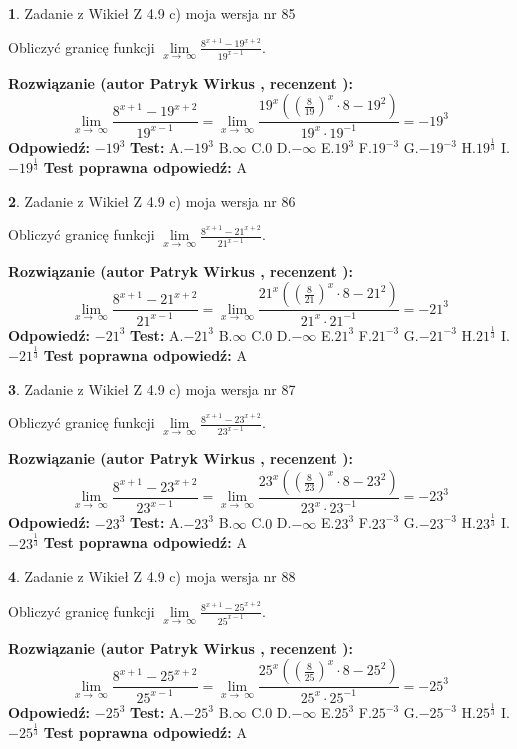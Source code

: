 \documentclass[12pt, a4paper]{article}
\theoremstyle{definition} %
\newtheorem{zad}{}
\newcommand{\zadStart}[1]{\begin{zad}#1\newline}
\newcommand{\zadStop}{\end{zad}}
\newcommand{\rozwStart}[2]{\noindent \textbf{Rozwiązanie (autor #1 , recenzent #2): }\newline}
\newcommand{\rozwStop}{\newline}
\newcommand{\odpStart}{\noindent \textbf{Odpowiedź:}\newline}
\newcommand{\odpStop}{\newline}
\newcommand{\testStart}{\noindent \textbf{Test:}\newline}
\newcommand{\testStop}{\newline}
\newcommand{\kluczStart}{\noindent \textbf{Test poprawna odpowiedź:}\newline}
\newcommand{\kluczStop}{\newline}
\begin{document}
\zadStart{Zadanie z Wikieł Z 4.9 c) moja wersja nr 85}


Obliczyć granicę funkcji  $\lim\limits_{x\to\ \infty}\frac{8^{x+1}-19^{x+2}}{19^{x-1}}$.
\zadStop
\rozwStart{Patryk Wirkus}{}
$$\lim\limits_{x\to\ \infty}\frac{8^{x+1}-19^{x+2}}{19^{x-1}}=\lim\limits_{x\to\ \infty}\frac{19^{x}((\frac{8}{19})^{x}\cdot 8 -19^{2})}{19^{x}\cdot 19^{-1}} = -19^{3}$$
\rozwStop
\odpStart
$-19^{3}$
\odpStop
\testStart
A.$-19^{3}$ B.$\infty$ C.$0$ D.$-\infty$ E.$19^{3}$
F.$19^{-3}$ G.$-19^{-3}$
H.$19^{\frac{1}{3}}$
I.$-19^{\frac{1}{3}}$
\testStop
\kluczStart
A
\kluczStop



\zadStart{Zadanie z Wikieł Z 4.9 c) moja wersja nr 86}


Obliczyć granicę funkcji  $\lim\limits_{x\to\ \infty}\frac{8^{x+1}-21^{x+2}}{21^{x-1}}$.
\zadStop
\rozwStart{Patryk Wirkus}{}
$$\lim\limits_{x\to\ \infty}\frac{8^{x+1}-21^{x+2}}{21^{x-1}}=\lim\limits_{x\to\ \infty}\frac{21^{x}((\frac{8}{21})^{x}\cdot 8 -21^{2})}{21^{x}\cdot 21^{-1}} = -21^{3}$$
\rozwStop
\odpStart
$-21^{3}$
\odpStop
\testStart
A.$-21^{3}$ B.$\infty$ C.$0$ D.$-\infty$ E.$21^{3}$
F.$21^{-3}$ G.$-21^{-3}$
H.$21^{\frac{1}{3}}$
I.$-21^{\frac{1}{3}}$
\testStop
\kluczStart
A
\kluczStop



\zadStart{Zadanie z Wikieł Z 4.9 c) moja wersja nr 87}


Obliczyć granicę funkcji  $\lim\limits_{x\to\ \infty}\frac{8^{x+1}-23^{x+2}}{23^{x-1}}$.
\zadStop
\rozwStart{Patryk Wirkus}{}
$$\lim\limits_{x\to\ \infty}\frac{8^{x+1}-23^{x+2}}{23^{x-1}}=\lim\limits_{x\to\ \infty}\frac{23^{x}((\frac{8}{23})^{x}\cdot 8 -23^{2})}{23^{x}\cdot 23^{-1}} = -23^{3}$$
\rozwStop
\odpStart
$-23^{3}$
\odpStop
\testStart
A.$-23^{3}$ B.$\infty$ C.$0$ D.$-\infty$ E.$23^{3}$
F.$23^{-3}$ G.$-23^{-3}$
H.$23^{\frac{1}{3}}$
I.$-23^{\frac{1}{3}}$
\testStop
\kluczStart
A
\kluczStop



\zadStart{Zadanie z Wikieł Z 4.9 c) moja wersja nr 88}


Obliczyć granicę funkcji  $\lim\limits_{x\to\ \infty}\frac{8^{x+1}-25^{x+2}}{25^{x-1}}$.
\zadStop
\rozwStart{Patryk Wirkus}{}
$$\lim\limits_{x\to\ \infty}\frac{8^{x+1}-25^{x+2}}{25^{x-1}}=\lim\limits_{x\to\ \infty}\frac{25^{x}((\frac{8}{25})^{x}\cdot 8 -25^{2})}{25^{x}\cdot 25^{-1}} = -25^{3}$$
\rozwStop
\odpStart
$-25^{3}$
\odpStop
\testStart
A.$-25^{3}$ B.$\infty$ C.$0$ D.$-\infty$ E.$25^{3}$
F.$25^{-3}$ G.$-25^{-3}$
H.$25^{\frac{1}{3}}$
I.$-25^{\frac{1}{3}}$
\testStop
\kluczStart
A
\kluczStop
\end{document}
